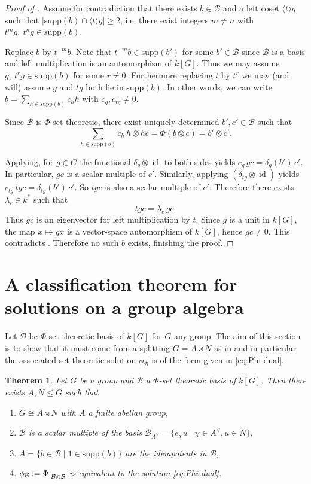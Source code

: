 \documentclass[a4paper,10pt]{amsart}
\newtheorem{theorem}[lemma]{Theorem}
\theoremstyle{definition}
\theoremstyle{remark}
\DeclareMathOperator{\id}{id}
\newcommand{\Supp}{\mathrm{supp}}
\newcommand\ot{\otimes}
\newcommand\mc{\mathcal}
\newcommand\restr[2]{{%
   \left.\kern-\nulldelimiterspace %
   #1 %
   \right|_{#2} %
   }}
\begin{document}
\begin{proof}[Proof of ]
Assume for contradiction that there exists $b\in \mc{B}$ and a left coset $\langle t\rangle g$ such that
$|\Supp(b)\cap \langle t\rangle g| \geq 2$, i.e. there exist integers $m\neq n$ with $t^m g,\ t^n g\in \Supp(b).$

Replace $b$ by $t^{-m}b$. Note that $t^{-m}b \in \Supp(b')$ for some $b' \in \mc{B}$ since $\mc{B}$ is a basis and left multiplication is an automorphism of $k[G]$. Thus we may assume $g,\ t^r g\in \Supp(b)$ for some $r\neq 0$. Furthermore replacing $t$  by $t^{r}$ we may (and will) assume $g$ and $tg$ both lie in $\Supp(b)$. In other words, we can write $b=\sum_{h\in \Supp(b)} c_h h$ with $c_g,c_{tg}\neq 0$.


Since $\mc{B}$ is $\Phi$-set theoretic, there exist uniquely determined $b',c'\in \mc{B}$ such that
\[
\sum_{h\in \Supp(b)} c_h\, h\ot hc = \Phi(b\ot c)=b'\ot c'.
\]

Applying, for $g \in G$ the functional $\delta_g\ot \id$ to both sides yields $ c_g\,gc=\delta_g(b')\, c'.$
In particular, $gc$ is a scalar multiple of $c'$.
Similarly, applying $(\delta_{tg}\ot \id)$ yields $c_{tg}\, tgc=\delta_{tg}(b')\, c'$. So $tgc$ is also a scalar multiple of $c'$.
Therefore there exists $\lambda_c\in k^*$ such that
\[
tgc=\lambda_c\,gc.
\]
Thus $gc$ is an eigenvector for left multiplication by $t$.
Since $g$ is a unit in $k[G]$, the map $x\mapsto gx$ is a vector-space automorphism of $k[G]$,
hence $gc\neq 0$.
This contradicts . Therefore no such $b$ exists, finishing the proof.
\end{proof}

\section{A classification theorem for solutions on a group algebra}\label{reconstruction theorem section} 

Let $\mc{B}$ be $\Phi$-set theoretic basis of $k[G]$ for $G$ any group. The aim of this section is to show that it must come from a splitting $G = A \rtimes N$ as in  and in particular the associated set theoretic solution $\phi_{\mc{B}}$ is of the form given in \eqref{eq:Phi-dual}.


\begin{theorem}\label{Classification theorem basis grp alg}
Let $G$ be a group and $\mc{B}$ a $\Phi$-set theoretic basis of $k[G]$. Then there exists $A,N \leq G$ such that
\begin{enumerate}
    \item $G \cong A \rtimes N$ with $A$ a finite abelian group,
    \item $\mc{B}$ is a scalar multiple of the basis $\mc{B}_{A^{\vee}}= \{ e_{\chi} u \mid  \chi \in A^{\vee}, u \in N\}$,
    \item $A= \{ b\in \mc{B} \mid 1 \in \Supp(b) \}$ are the idempotents in $\mc{B}$,
    \item $\phi_{\mc{B}} := \restr{\Phi}{\mc{B} \ot \mc{B}}$ is equivalent to the solution \eqref{eq:Phi-dual}.
\end{enumerate}
\end{theorem}
\end{document}
